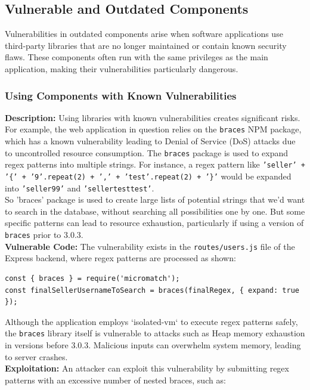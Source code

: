 \documentclass[]{article}
\begin{document}
\subsection{Vulnerable and Outdated Components}

Vulnerabilities in outdated components arise when software applications use third-party libraries that are no longer maintained or contain known security flaws. These components often run with the same privileges as the main application, making their vulnerabilities particularly dangerous.

\subsubsection{Using Components with Known Vulnerabilities}

\textbf{Description:}
Using libraries with known vulnerabilities creates significant risks. For example, the web application in question relies on the \texttt{braces} NPM package, which has a known vulnerability leading to Denial of Service (DoS) attacks due to uncontrolled resource consumption. The \texttt{braces} package is used to expand regex patterns into multiple strings. For instance, a regex pattern like \texttt{'seller' + '\{' + '9'.repeat(2) + ',' + 'test'.repeat(2) + '\}'} would be expanded into \texttt{'seller99'} and \texttt{'sellertesttest'}. \\ 
So 'braces' package is used to create large lists of potential strings that we'd want to search in the database, without searching all possibilities one by one. But some specific patterns can lead to resource exhaustion, particularly if using a version of \texttt{braces} prior to 3.0.3. \\ 
\textbf{Vulnerable Code:}
The vulnerability exists in the \texttt{routes/users.js} file of the Express backend, where regex patterns are processed as shown:

\begin{lstlisting}
const { braces } = require('micromatch');
const finalSellerUsernameToSearch = braces(finalRegex, { expand: true });
\end{lstlisting}
Although the application employs `isolated-vm` to execute regex patterns safely, the \texttt{braces} library itself is vulnerable to attacks such as Heap memory exhaustion in versions before 3.0.3. Malicious inputs can overwhelm system memory, leading to server crashes. \\ 
\textbf{Exploitation:}
An attacker can exploit this vulnerability by submitting regex patterns with an excessive number of nested braces, such as:
\end{document}
